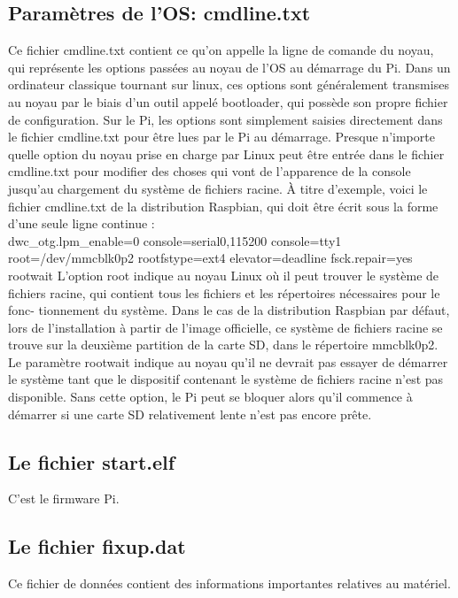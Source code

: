 \documentclass[12pt,a4paper,oneside]{book}
\begin{document}
			\subsection{Paramètres de l'OS: cmdline.txt}
				Ce fichier cmdline.txt contient ce qu'on appelle la ligne de comande du noyau, qui représente les options passées au noyau de l'OS au démarrage du Pi.
				Dans un ordinateur classique tournant sur linux, ces options sont généralement transmises au noyau par le biais d'un outil appelé bootloader, qui possède son propre fichier de configuration. Sur le Pi, les options sont simplement saisies directement dans le fichier cmdline.txt pour être lues par le Pi au démarrage.
				Presque n’importe quelle option du noyau prise en charge par Linux peut être entrée dans le fichier cmdline.txt pour modifier des choses qui vont de l’apparence de la console jusqu’au chargement du système de fichiers racine. À titre d’exemple, voici le fichier cmdline.txt de la distribution Raspbian, qui doit être écrit sous la forme d’une seule ligne continue :\\
				dwc\_otg.lpm\_enable=0 console=serial0,115200 console=tty1 root=/dev/mmcblk0p2
				rootfstype=ext4 elevator=deadline fsck.repair=yes rootwait
				\newline
				L’option root indique au noyau Linux où il peut trouver le système de fichiers
				racine, qui contient tous les fichiers et les répertoires nécessaires pour le fonc-
				tionnement du système. Dans le cas de la distribution Raspbian par défaut, lors de
				l’installation à partir de l’image officielle, ce système de fichiers racine se trouve
				sur la deuxième partition de la carte SD, dans le répertoire mmcblk0p2.\\
				 Le paramètre rootwait indique au noyau qu’il ne devrait pas essayer de démarrer le système tant que le dispositif contenant le système de fichiers racine n’est pas disponible. Sans cette option, le Pi peut se bloquer alors qu’il commence à démarrer si une carte SD relativement lente n’est pas encore prête.
				 
 			\subsection{Le fichier start.elf}
 				C'est le firmware Pi.
 			
 			\subsection{Le fichier fixup.dat}
 				Ce fichier de données contient des informations importantes relatives au matériel.
\end{document}
